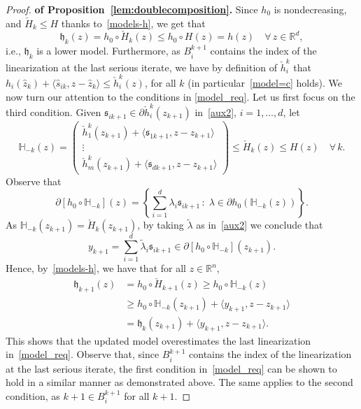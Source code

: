 \documentclass[smallextended,envcountsect]{svjour3}
\newcommand{\col}[1]{\left\{#1\right\}}
\newcommand{\inner}[2]{\langle#1,#2\rangle}
\renewcommand{\Re}{\mathbb{R}}
\newcommand{\modelh}{\mathfrak{h}}
\begin{document}
\begin{proof} 
 {\bf of Proposition~\ref{lem:doublecomposition}.}
Since $h_0$ is nondecreasing, and $\check{H}_k\leq H$ thanks to~\eqref{models-h}, we get that 
\[
\modelh_k(z) = h_0\circ \check{H}_k(z)\leq h_0\circ H(z)=h(z)\quad \forall\, z \in \Re^d,
\]
i.e., $\modelh_k$ is a lower model. Furthermore, as  $B_i^{k+1}$ contains the index of the linearization at the last serious iterate,
 we have by definition of $\check{h}_i^k$ that
$h_i(\hat z_k)+\inner{\hat s_{ik}}{z-\hat z_k}\leq \check{h}^k_{i}(z)$, for all $k$ (in particular~\eqref{model=c} holds).
We now turn our attention to the conditions in \eqref{model_req}.
Let us first focus on the third condition.
Given  $\mathfrak{s}_{i{k+1}} \in \partial  \check{h}_i^k(z_{k+1})$ in~\eqref{aux2}, $i=1,\ldots,d$, let 
\[
\mathbb{H}_{-k}(z)=
\begin{pmatrix}
\check{h}_1^k(z_{k+1})+\inner{\mathfrak{s}_{1k+1}}{z-z_{k+1}}\\
\vdots\\
\check{h}_m^k(z_{k+1})+\inner{\mathfrak{s}_{dk+1}}{z-z_{k+1}}
\end{pmatrix}
\leq \check{H}_{k}(z)\leq H(z)\quad \forall\, k.
\]
Observe that
\[
\partial  [h_0\circ \mathbb{H}_{-k}](z)= \col{\sum_{i=1}^d\lambda_i\mathfrak{s}_{ik+1}\,:\; \lambda \in \partial h_0(\mathbb{H}_{-k}(z))}.
\]
As $\mathbb{H}_{-k}(z_{k+1})=\check{H}_k(z_{k+1})$,
by taking $\tilde \lambda $ as in~\eqref{aux2} we conclude that
\[
y_{k+1}=\sum_{i=1}^d\tilde\lambda_i\mathfrak{s}_{ik+1} \in 
\partial  [h_0\circ \mathbb{H}_{-k}](z_{k+1}).
\]
Hence, by~\eqref{models-h}, we have that for all $z\in \Re^n$,
\begin{align*}
\modelh_{k+1}(z)&= h_0\circ \check{H}_{k+1}(z) \geq  h_0\circ \mathbb{H}_{-k}(z) \\
&\geq h_0\circ \mathbb{H}_{-k}(z_{k+1})+\inner{y_{k+1}}{z-z_{k+1}}\\
&= \modelh_k(z_{k+1})+\inner{y_{k+1}}{z-z_{k+1}}.
\end{align*}
This shows that the updated model overestimates the last linearization in~\eqref{model_req}.
%
Observe that, since $B_i^{k+1}$ contains the index of the linearization at the last serious iterate, the first condition in~\eqref{model_req} can be shown to hold in a similar manner as demonstrated above. The same applies to the second condition, as ${k+1} \in B_i^{k+1}$ for all $k+1$.


\end{proof}
\end{document}
